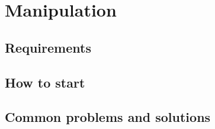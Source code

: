 \documentclass[main.tex]{subfiles}
\begin{document}
	\chapter{Manipulation}
	
	\section{Requirements}
	
	\section{How to start}
	
	\section{Common problems and solutions}
\end{document}
